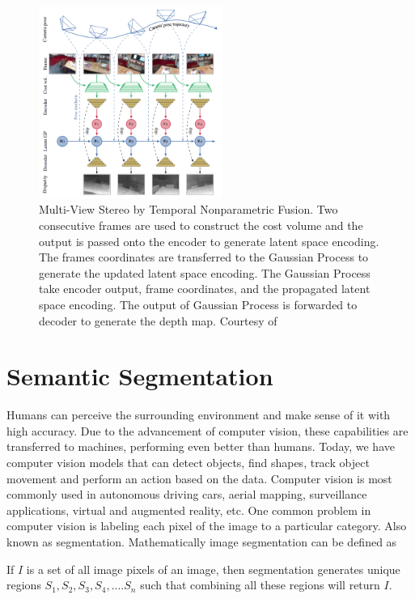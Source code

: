     \begin{figure}
    	\centering
    	\includegraphics[width=6cm]{images/MVS.png}
    	\caption{Multi-View Stereo by Temporal Nonparametric Fusion. Two consecutive frames are used to construct the cost volume and the output is passed onto the encoder to generate latent space encoding. The frames coordinates are transferred to the Gaussian Process to generate the updated latent space encoding. The Gaussian Process take encoder output, frame coordinates, and the propagated latent space encoding. The output of Gaussian Process is forwarded to decoder to generate the depth map. Courtesy of \cite{52_hou2019multi}}
    	\label{fig:mvs}
    \end{figure} 	

    \section{Semantic Segmentation}
    \label{sec:semseg}
    
    Humans can perceive the surrounding environment and make sense of it with high accuracy. Due to the advancement of computer vision, these capabilities are transferred to machines, performing even better than humans. Today, we have computer vision models that can detect objects, find shapes, track object movement and perform an action based on the data. Computer vision is most commonly used in autonomous driving cars, aerial mapping, surveillance applications, virtual and augmented reality, etc. One common problem in computer vision is labeling each pixel of the image to a particular category. Also known as segmentation. Mathematically image segmentation can be defined as

	If $I$ is a set of all image pixels of an image, then segmentation generates unique regions ${S_1, S_2, S_3, S_4,....S_n}$ such that combining all these regions will return $I$. 
	
